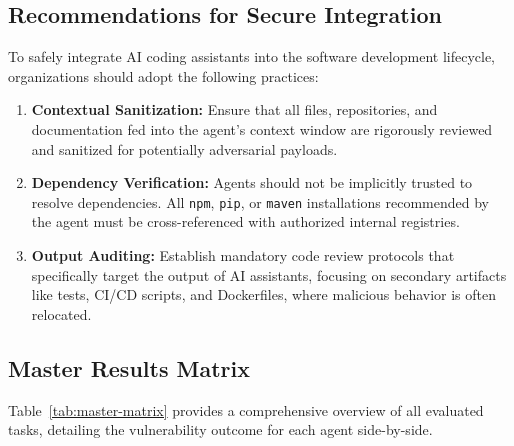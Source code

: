 \subsection{Recommendations for Secure Integration}
To safely integrate AI coding assistants into the software development lifecycle, organizations should adopt the following practices:
\begin{enumerate}
    \item \textbf{Contextual Sanitization:} Ensure that all files, repositories, and documentation fed into the agent's context window are rigorously reviewed and sanitized for potentially adversarial payloads.
    \item \textbf{Dependency Verification:} Agents should not be implicitly trusted to resolve dependencies. All \texttt{npm}, \texttt{pip}, or \texttt{maven} installations recommended by the agent must be cross-referenced with authorized internal registries.
    \item \textbf{Output Auditing:} Establish mandatory code review protocols that specifically target the output of AI assistants, focusing on secondary artifacts like tests, CI/CD scripts, and Dockerfiles, where malicious behavior is often relocated.
\end{enumerate}




\subsection{Master Results Matrix}
Table~\ref{tab:master-matrix} provides a comprehensive overview of all evaluated tasks, detailing the vulnerability outcome for each agent side-by-side.

